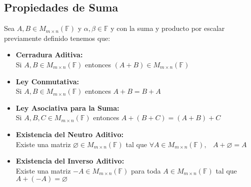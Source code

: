 \documentclass[12pt]{report}                                    %
\DeclareMathOperator \Space {\quad}                             %
\DeclareMathOperator \MiniSpace {\;}                            %
\begin{document}
            \subsection{Propiedades de Suma}

                Sea $A, B \in M_{m \times n}(\mathbb{F})$ y $\alpha, \beta \in \mathbb{F}$
                y con la suma y producto por escalar previamente definido tenemos que:

                \begin{itemize}

                    \item \textbf{Cerradura Aditiva:}\\
                        Si $A, B \in M_{m \times n}(\mathbb{F})$ entonces 
                        $(A+B) \in M_{m \times n}(\mathbb{F})$


                    \item \textbf{Ley Conmutativa:}\\
                        Si $A, B \in M_{m \times n}(\mathbb{F})$ entonces $A+B = B+A$

                    \item \textbf{Ley Asociativa para la Suma:}\\
                        Si $A, B, C \in M_{m \times n}(\mathbb{F})$ entonces 
                        $A + (B+C) = (A+B) + C$

                    \item \textbf{Existencia del Neutro Aditivo:}\\
                        Existe una matriz $\varnothing \in M_{m \times n}(\mathbb{F})$
                        tal que $\forall A \in M_{m \times n}(\mathbb{F}), \MiniSpace A + \varnothing = A$

                    \item \textbf{Existencia del Inverso Aditivo:}\\
                        Existe una matriz $-A \in M_{m \times n}(\mathbb{F})$ para toda 
                        $A \in M_{m \times n}(\mathbb{F})$ tal que $ A + (-A) = \varnothing$

                \end{itemize}




        \clearpage
\end{document}
